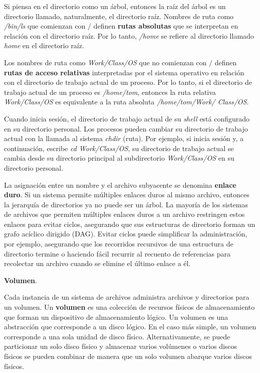 \documentclass[10pt]{book}
\begin{document}
Si piensa en el directorio como un árbol, entonces la raíz del árbol es un directorio llamado, naturalmente, el directorio raíz. Nombres de ruta como \textit{/bin/ls} que comienzan con $/$ definen \textbf{rutas absolutas} que se interpretan en relación con el directorio raíz. Por lo tanto, \textit{/home} se refiere al directorio llamado \textit{home} en el directorio raíz.

Los nombres de ruta como \textit{Work/Class/OS} que no comienzan con $/$ definen \textbf{rutas de acceso relativas} interpretadas por el sistema operativo en relación con el directorio de trabajo actual de un proceso. Por lo tanto, si el directorio de trabajo actual de un proceso es \textit{/home/tom}, entonces la ruta relativa \textit{Work/Class/OS} es equivalente a la ruta absoluta \textit{/home/tom/Work/ Class/OS}.

Cuando inicia sesión, el directorio de trabajo actual de su \textit{shell} está configurado en su directorio personal. Los procesos pueden cambiar su directorio de trabajo actual con la llamada al sistema \textit{chdir} (ruta). Por ejemplo, si inicia sesión y, a continuación, escribe \textit{cd Work/Class/OS}, su directorio de trabajo actual se cambia desde su directorio principal al subdirectorio \textit{Work/Class/OS} en su directorio personal.

La asignación entre un nombre y el archivo subyacente se denomina \textbf{enlace duro}. Si un sistema permite múltiples enlaces duros al mismo archivo, entonces la jerarquía de directorios ya no puede ser un árbol. La mayoría de los sistemas de archivos que permiten múltiples enlaces duros a un archivo restringen estos enlaces para evitar ciclos, asegurando que sus estructuras de directorio forman un grafo acíclico dirigido (DAG). Evitar ciclos puede simplificar la administración, por ejemplo, asegurando que los recorridos recursivos de una estructura de directorio termine o haciendo fácil recurrir al recuento de referencias para recolectar un archivo cuando se elimine el último enlace a él.

\vspace{0.5cm}
\textbf{Volumen}. 

Cada instancia de un sistema de archivos administra archivos y directorios para un volumen. Un \textbf{volumen} es una colección de recursos físicos de almacenamiento que forman un dispositivo de almacenamiento lógico. Un volumen es una abstracción que corresponde a un disco lógico. En el caso más simple, un volumen corresponde a una sola unidad de disco físico. Alternativamente, se puede particionar un solo disco físico y almacenar varios volúmenes o varios discos físicos se pueden combinar de manera que un solo volumen abarque varios discos físicos.
\end{document}
